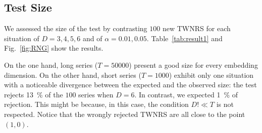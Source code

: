 \documentclass[alpha-refs]{wiley-article}
\begin{document}
\subsection{Test Size}

We assessed the size of the test by contrasting $100$ new TWNRS for each situation of $D=3,4,5,6$ and of $\alpha=0.01,0.05$.
Table~\ref{tab:result1} and Fig.~\ref{fig:RNG} 
show the results.

On the one hand, long series ($T=50000$) present a good size for every embedding dimension.
On the other hand, short series ($T=1000$) exhibit only one situation with a noticeable divergence between the expected and the observed size: the test rejects \SI{13}{\percent} of the $100$ series when $D=6$. 
In contrast, we expected \SI{1}{\percent} of rejection.
This might be because, in this case, the condition $D!\ll T$ is not respected.
Notice that the wrongly rejected TWNRS are all close to the point $(1,0)$.

%
%
%
\end{document}
